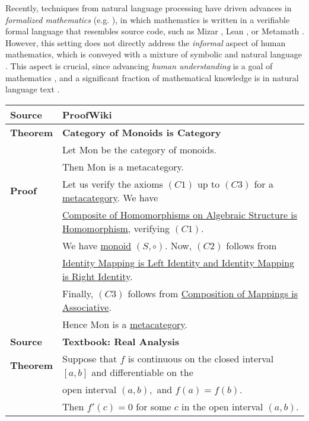 Recently, techniques from natural language processing have driven advances in \textit{formalized mathematics} (e.g. \citet{polu2020generative,rabe2021mathematical,wu2021lime}), in which mathematics is written in a verifiable formal language that resembles source code, such as  Mizar \citep{urban2006mptp},  Lean \citep{demoura2015lean}, or Metamath \citep{megill2019metamath}.
However, this setting does not directly address the \textit{informal} aspect of human mathematics, which is conveyed with a mixture of symbolic and natural language \citep{gowers2008princetoncompanion}.
This aspect is crucial, since advancing \textit{human understanding} is a goal of mathematics \citep{thurston1994proof}, and a significant fraction of mathematical knowledge is in natural language text \citep{szegedy2020promising}.

\begin{table}[t]
\footnotesize
\setlength{\tabcolsep}{2pt}
\begin{center}
\begin{tabular}{l p{12cm}}
\toprule
\textbf{Source} & \textbf{ProofWiki} \\
\hline
\textbf{Theorem} & \textbf{Category of Monoids is Category} \\
& Let $\mathrm{Mon}$ be the category of monoids. \\
& Then $\mathrm{Mon}$ is a metacategory. \\
\hline
\textbf{Proof} & Let us verify the axioms $(C1)$ up to $(C3)$ for a {\uline{metacategory}}. We have \\
& {\uline{Composite of Homomorphisms on Algebraic Structure is Homomorphism}}, verifying $(C1)$. \\
& We have {\uline{monoid}} $\left({S, \circ}\right)$. Now, $(C2)$ follows from \\
& {\uline{Identity Mapping is Left Identity and Identity Mapping is Right Identity}}. \\
& Finally, $(C3)$ follows from {\uline{Composition of Mappings is Associative}}. \\
& Hence $\mathrm{Mon}$ is a {\uline{metacategory}}. \\
\bottomrule
\addlinespace[0.2em]
\toprule
\textbf{Source} & \textbf{Textbook: Real Analysis} \\
\hline
\textbf{Theorem} & Suppose that  $f$ is continuous on the closed interval $[a,b]$ and differentiable on the \\
& open interval $(a,b),$ and $f(a)=f(b).$\\ 
& Then $f'(c)=0$ for some $c$ in the open interval $(a,b).$\\

\end{tabular}
\end{center}
\end{table}
